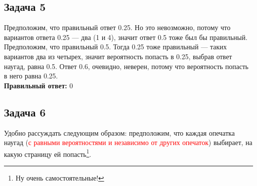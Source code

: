 \documentclass[a4paper,12pt]{article}
\theoremstyle{plain}                         %
\theoremstyle{definition}                  %
\theoremstyle{remark}                      %
\begin{document}
\subsection*{Задача 5}
 Предположим, что правильный ответ 0.25. Но это невозможно, потому что вариантов ответа 0.25 --- два (1 и 4), значит ответ 0.5 тоже был бы правильный. Предположим, что правильный 0.5. Тогда 0.25 тоже правильный --- таких вариантов два из четырех, значит вероятность попасть в 0.25, выбрав ответ наугад, равна 0.5. Ответ 0.6, очевидно, неверен, потому что вероятность попасть в него равна 0.25. \\
\textbf{Правильный ответ:} 0

\newpage
\subsection*{Задача 6}
Удобно рассуждать следующим образом: предположим, что каждая опечатка наугад (\textcolor{red}{с равными вероятностями и независимо от других опечаток}) выбирает, на какую страницу ей попасть\footnote[1]{Ну очень самостоятельные!}. 
\end{document}
